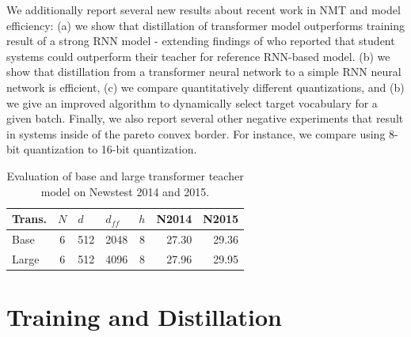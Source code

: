 \documentclass[11pt,a4paper]{article}
\begin{document}
We additionally report several new results about recent work in NMT
and model efficiency: (a) we show that distillation of transformer
model outperforms training result of a strong RNN model - extending
findings of \cite{DBLP:journals/corr/CregoS16} who reported that
student systems could outperform their teacher for reference RNN-based
model. (b) we show that distillation from a transformer neural network
to a simple RNN neural network is efficient, (c) we compare
quantitatively different quantizations, and (b) we give an improved
algorithm to dynamically select  target vocabulary for a given batch.
Finally, we also report several other negative experiments that
result in  systems inside of the pareto convex border. For instance, we
compare using 8-bit quantization to 16-bit quantization.


\begin{table}[]
\centering
\begin{tabular}{lccccrr}
\toprule
Trans.                    & \multicolumn{1}{l}{\(\displaystyle N \)} & \multicolumn{1}{l}{\(\displaystyle d \)} & \multicolumn{1}{l}{\(\displaystyle d_{ff} \)} & \multicolumn{1}{l}{\(\displaystyle h \)} & \multicolumn{1}{l}{N2014} & \multicolumn{1}{l}{N2015} \\

\midrule
 Base  & 6                     & 512                        & 2048                  & 8                        & 27.30                            & 29.36                            \\
 Large & 6                     & 512                        & 4096                  & 8                        & 27.96                            & 29.95                            \\
\bottomrule
\end{tabular}
\caption{Evaluation of base and large transformer teacher model on Newstest 2014 and 2015.}
\label{table:transformer}
\end{table}

\section{Training and Distillation}

\end{document}
